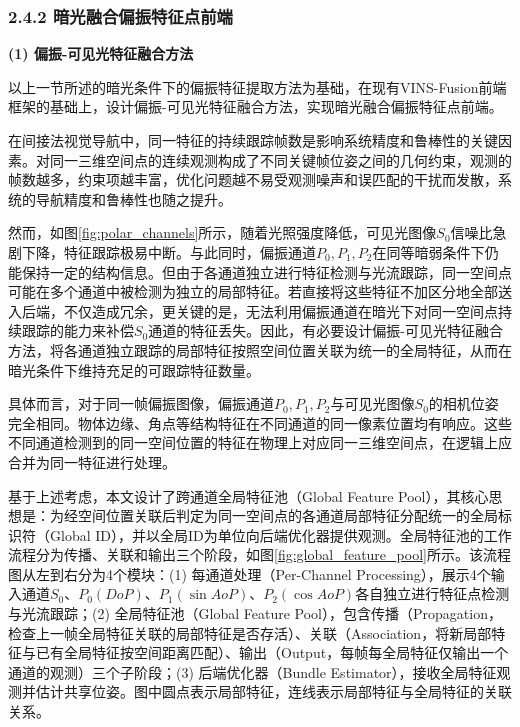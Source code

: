\subsubsection*{2.4.2 暗光融合偏振特征点前端}

\textbf{(1) 偏振-可见光特征融合方法}

以上一节所述的暗光条件下的偏振特征提取方法为基础，在现有VINS-Fusion\cite{qin2019vinsfusion}前端框架的基础上，设计偏振-可见光特征融合方法，实现暗光融合偏振特征点前端。

在间接法视觉导航中，同一特征的持续跟踪帧数是影响系统精度和鲁棒性的关键因素。对同一三维空间点的连续观测构成了不同关键帧位姿之间的几何约束，观测的帧数越多，约束项越丰富，优化问题越不易受观测噪声和误匹配的干扰而发散，系统的导航精度和鲁棒性也随之提升。

然而，如图\ref{fig:polar_channels}所示，随着光照强度降低，可见光图像$S_0$信噪比急剧下降，特征跟踪极易中断。与此同时，偏振通道$P_0, P_1, P_2$在同等暗弱条件下仍能保持一定的结构信息。但由于各通道独立进行特征检测与光流跟踪，同一空间点可能在多个通道中被检测为独立的局部特征。若直接将这些特征不加区分地全部送入后端，不仅造成冗余，更关键的是，无法利用偏振通道在暗光下对同一空间点持续跟踪的能力来补偿$S_0$通道的特征丢失。因此，有必要设计偏振-可见光特征融合方法，将各通道独立跟踪的局部特征按照空间位置关联为统一的全局特征，从而在暗光条件下维持充足的可跟踪特征数量。

具体而言，对于同一帧偏振图像，偏振通道$P_0, P_1, P_2$与可见光图像$S_0$的相机位姿完全相同。物体边缘、角点等结构特征在不同通道的同一像素位置均有响应。这些不同通道检测到的同一空间位置的特征在物理上对应同一三维空间点，在逻辑上应合并为同一特征进行处理。

基于上述考虑，本文设计了跨通道全局特征池（Global Feature Pool），其核心思想是：为经空间位置关联后判定为同一空间点的各通道局部特征分配统一的全局标识符（Global ID），并以全局ID为单位向后端优化器提供观测。全局特征池的工作流程分为传播、关联和输出三个阶段，如图\ref{fig:global_feature_pool}所示。该流程图从左到右分为4个模块：(1) 每通道处理（Per-Channel Processing），展示4个输入通道$S_0$、$P_0(DoP)$、$P_1(\sin AoP)$、$P_2(\cos AoP)$各自独立进行特征点检测与光流跟踪；(2) 全局特征池（Global Feature Pool），包含传播（Propagation，检查上一帧全局特征关联的局部特征是否存活）、关联（Association，将新局部特征与已有全局特征按空间距离匹配）、输出（Output，每帧每全局特征仅输出一个通道的观测）三个子阶段；(3) 后端优化器（Bundle Estimator），接收全局特征观测并估计共享位姿。图中圆点表示局部特征，连线表示局部特征与全局特征的关联关系。

